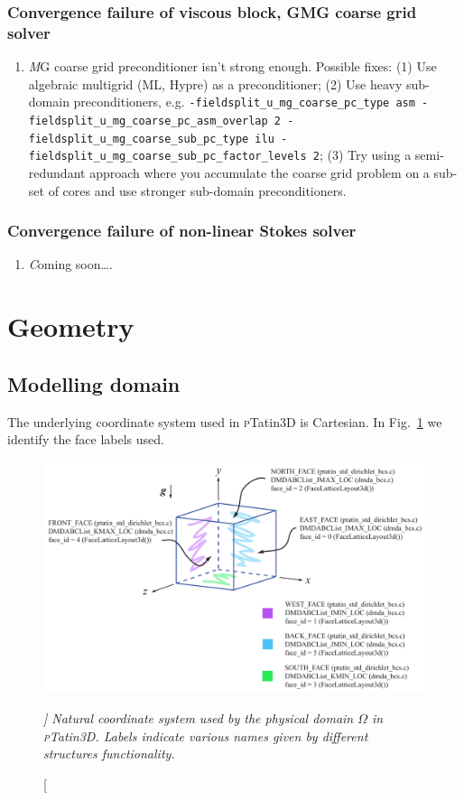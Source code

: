 \documentclass[paper=a4, fontsize=11pt,twoside]{scrartcl}
\newcommand{\ptat}{{{\textsc pTatin3D}}}
\newcommand{\unix}[1]{\texttt{\footnotesize #1}}
\begin{document}
{{\subsubsection*{Convergence failure of viscous block, GMG coarse grid solver}
\begin{enumerate}
	\item {\textit MG coarse grid preconditioner isn't strong enough}. Possible fixes: 
	(1) Use algebraic multigrid (ML, Hypre) as a preconditioner; 
	(2) Use heavy sub-domain preconditioners, e.g. \unix{-fieldsplit\_u\_mg\_coarse\_pc\_type asm -fieldsplit\_u\_mg\_coarse\_pc\_asm\_overlap 2 
	-fieldsplit\_u\_mg\_coarse\_sub\_pc\_type ilu -fieldsplit\_u\_mg\_coarse\_sub\_pc\_factor\_levels 2};
	(3) Try using a semi-redundant approach where you accumulate the coarse grid problem on a sub-set of cores and use stronger sub-domain preconditioners.
\end{enumerate}

\subsubsection*{Convergence failure of non-linear Stokes solver}
\begin{enumerate}
	\item {\textit Coming soon\dots}.
\end{enumerate}



\section{Geometry}

\subsection{Modelling domain}
The underlying coordinate system used in {\ptat} is Cartesian. In Fig.~\ref{fig:domain_coord} we identify the face labels used.
\begin{figure} [hbtp]
\center
\includegraphics[height=0.4\textheight]{figs/pt3d_coordinate_system.pdf}
\caption[\itshape ]
{\itshape Natural coordinate system used by the physical domain $\Omega$ in {\ptat}. Labels indicate various names given by different structures functionality.}
\label{fig:domain_coord}
\end{figure}

}}
\end{document}
